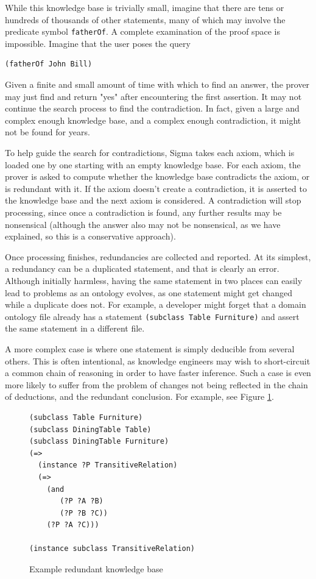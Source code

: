 \documentclass{book}
\begin{document}
While this knowledge base is trivially small, imagine that there are tens or
hundreds of thousands of other statements, many of which may involve the
predicate symbol {\tt fatherOf}.  A complete examination of the proof space is
impossible.  Imagine that the user poses the query

\begin{verbatim}
(fatherOf John Bill)
\end{verbatim}

Given a finite and small amount of time with which to find an answer, the prover
may just find and return "yes" after encountering the first assertion.  It may
not continue the search process to find the contradiction.  In fact, given a
large and complex enough knowledge base, and a complex enough contradiction, it
might not be found for years.

To help guide the search for contradictions, Sigma takes each axiom, which is
loaded one by one starting with an empty knowledge base.  For each axiom, the
prover is asked to compute whether the knowledge base contradicts the axiom, or
is redundant with it.  If the axiom doesn't create a contradiction, it is
asserted to the knowledge base and the next axiom is considered.  A
contradiction will stop processing, since once a contradiction is found, any
further results may be nonsensical (although the answer also may not be
nonsensical, as we have explained, so this is a conservative approach).

Once processing finishes, redundancies are collected and reported.  At its
simplest, a redundancy can be a duplicated statement, and that is clearly an
error. Although initially harmless, having the same statement in two places can
easily lead to problems as an ontology evolves, as one statement might get
changed while a duplicate does not.  For example, a developer might forget that
a domain ontology file already has a statement {\tt (subclass Table Furniture)}
and assert the same statement in a different file.

A more complex case is where one statement is simply deducible from several
others.  This is often intentional, as knowledge engineers may wish to
short-circuit a common chain of reasoning in order to have faster inference.
Such a case is even more likely to suffer from the problem of changes not being
reflected in the chain of deductions, and the redundant conclusion.  For
example, see Figure \ref{fig:RedunKB}.

\begin{figure}
\begin{framed}
\label{fig:RedunKB}
\begin{verbatim}
(subclass Table Furniture)
(subclass DiningTable Table)
(subclass DiningTable Furniture)
(=>
  (instance ?P TransitiveRelation)
  (=>
    (and
       (?P ?A ?B)
       (?P ?B ?C))
    (?P ?A ?C)))

(instance subclass TransitiveRelation)
\end{verbatim}
\caption{Example redundant knowledge base}
\end{framed}
\end{figure}
\end{document}
